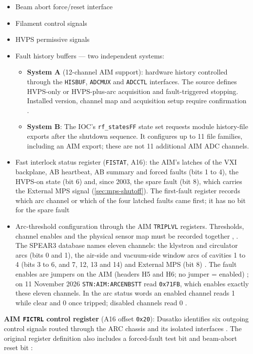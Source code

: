 \begin{itemize}
\tightlist
\item
  Beam abort force/reset interface
\item
  Filament control signals
\item
  HVPS permissive signals
\item
  Fault history buffers --- two independent systems:

  \begin{itemize}
  \tightlist
  \item
    \textbf{System A} (12-channel AIM support): hardware history controlled through the \texttt{HISBUF}, \texttt{ADCMUX} and \texttt{ADCCTL} interfaces. The source defines HVPS-only or HVPS-plus-arc acquisition and fault-triggered stopping. Installed version, channel map and acquisition setup require confirmation .
  \item
    \textbf{System B}: The IOC's \texttt{rf\_statesFF} state set requests module history-file exports after the shutdown sequence. It configures up to 11 file families, including an AIM export; these are not 11 additional AIM ADC channels.
  \end{itemize}
\item
  Fast interlock status register (\texttt{FISTAT}, A16): the AIM's latches of the VXI backplane, AB heartbeat, AB summary and forced faults (bits 1 to 4), the HVPS-on state (bit 6) and, since 2003, the spare fault (bit 8), which carries the External MPS signal (\cref{sec:mps-shutoff}). The first-fault register records which arc channel or which of the four latched faults came first; it has no bit for the spare fault 
\item
  Arc-threshold configuration through the AIM \texttt{TRIPLVL} registers. Thresholds, channel enables and the physical sensor map must be recorded together , . The SPEAR3 database names eleven channels: the klystron and circulator arcs (bits 0 and 1), the air-side and vacuum-side window arcs of cavities 1 to 4 (bits 3 to 6, and 7, 12, 13 and 14) and External MPS (bit 8) . The fault enables are jumpers on the AIM (headers H5 and H6; no jumper = enabled) ; on 11 November 2026 \texttt{STN:AIM:ARCENBSTT} read \texttt{0x71FB}, which enables exactly these eleven channels. In the arc status words an enabled channel reads 1 while clear and 0 once tripped; disabled channels read 0 .
\end{itemize}

\textbf{AIM \texttt{FICTRL} control register} (A16 offset \texttt{0x20}): Dusatko identifies six outgoing control signals routed through the ARC chassis and its isolated interfaces . The original register definition also includes a forced-fault test bit and beam-abort reset bit :

